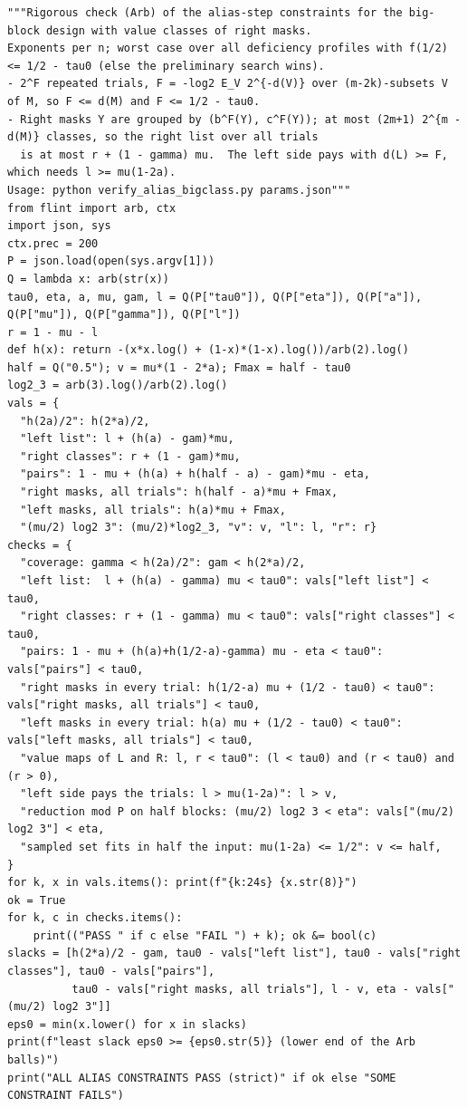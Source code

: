 \documentclass[10pt,a4paper]{article}
\begin{document}
\begin{lstlisting}
"""Rigorous check (Arb) of the alias-step constraints for the big-block design with value classes of right masks.
Exponents per n; worst case over all deficiency profiles with f(1/2) <= 1/2 - tau0 (else the preliminary search wins).
- 2^F repeated trials, F = -log2 E_V 2^{-d(V)} over (m-2k)-subsets V of M, so F <= d(M) and F <= 1/2 - tau0.
- Right masks Y are grouped by (b^F(Y), c^F(Y)); at most (2m+1) 2^{m - d(M)} classes, so the right list over all trials
  is at most r + (1 - gamma) mu.  The left side pays with d(L) >= F, which needs l >= mu(1-2a).
Usage: python verify_alias_bigclass.py params.json"""
from flint import arb, ctx
import json, sys
ctx.prec = 200
P = json.load(open(sys.argv[1]))
Q = lambda x: arb(str(x))
tau0, eta, a, mu, gam, l = Q(P["tau0"]), Q(P["eta"]), Q(P["a"]), Q(P["mu"]), Q(P["gamma"]), Q(P["l"])
r = 1 - mu - l
def h(x): return -(x*x.log() + (1-x)*(1-x).log())/arb(2).log()
half = Q("0.5"); v = mu*(1 - 2*a); Fmax = half - tau0
log2_3 = arb(3).log()/arb(2).log()
vals = {
  "h(2a)/2": h(2*a)/2,
  "left list": l + (h(a) - gam)*mu,
  "right classes": r + (1 - gam)*mu,
  "pairs": 1 - mu + (h(a) + h(half - a) - gam)*mu - eta,
  "right masks, all trials": h(half - a)*mu + Fmax,
  "left masks, all trials": h(a)*mu + Fmax,
  "(mu/2) log2 3": (mu/2)*log2_3, "v": v, "l": l, "r": r}
checks = {
  "coverage: gamma < h(2a)/2": gam < h(2*a)/2,
  "left list:  l + (h(a) - gamma) mu < tau0": vals["left list"] < tau0,
  "right classes: r + (1 - gamma) mu < tau0": vals["right classes"] < tau0,
  "pairs: 1 - mu + (h(a)+h(1/2-a)-gamma) mu - eta < tau0": vals["pairs"] < tau0,
  "right masks in every trial: h(1/2-a) mu + (1/2 - tau0) < tau0": vals["right masks, all trials"] < tau0,
  "left masks in every trial: h(a) mu + (1/2 - tau0) < tau0": vals["left masks, all trials"] < tau0,
  "value maps of L and R: l, r < tau0": (l < tau0) and (r < tau0) and (r > 0),
  "left side pays the trials: l > mu(1-2a)": l > v,
  "reduction mod P on half blocks: (mu/2) log2 3 < eta": vals["(mu/2) log2 3"] < eta,
  "sampled set fits in half the input: mu(1-2a) <= 1/2": v <= half,
}
for k, x in vals.items(): print(f"{k:24s} {x.str(8)}")
ok = True
for k, c in checks.items():
    print(("PASS " if c else "FAIL ") + k); ok &= bool(c)
slacks = [h(2*a)/2 - gam, tau0 - vals["left list"], tau0 - vals["right classes"], tau0 - vals["pairs"],
          tau0 - vals["right masks, all trials"], l - v, eta - vals["(mu/2) log2 3"]]
eps0 = min(x.lower() for x in slacks)
print(f"least slack eps0 >= {eps0.str(5)} (lower end of the Arb balls)")
print("ALL ALIAS CONSTRAINTS PASS (strict)" if ok else "SOME CONSTRAINT FAILS")
\end{lstlisting}
\end{document}
